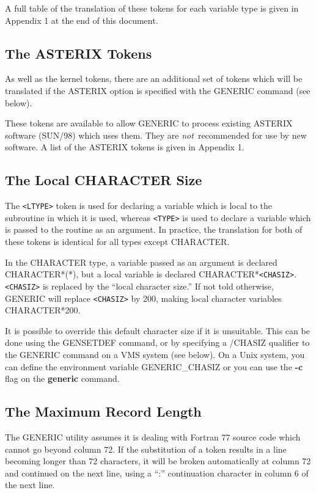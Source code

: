 A full table of the translation of these tokens
for each variable type is given in
Appendix 1 at the end of this document. 

\subsection{The ASTERIX Tokens}

As well as the kernel tokens, there are an additional set of
tokens which will be translated if the ASTERIX option is specified
with the GENERIC command (see below).

These tokens are available to allow GENERIC to process existing
ASTERIX software (SUN/98) which uses them.
They are {\em not}\ recommended for use by new software.
A list of the ASTERIX tokens is given in Appendix 1.

\subsection{The Local CHARACTER Size}

The \verb+<LTYPE>+ token is used for declaring a variable which is local
to the subroutine in which it is used, whereas \verb+<TYPE>+ is used
to declare a variable which is passed to the routine as an argument.
In practice, the translation for both of these tokens is identical
for all types except CHARACTER.

In the CHARACTER type, a variable passed as an argument is declared
CHARACTER*(*), but a local variable is declared CHARACTER*\verb+<CHASIZ>+.
\verb+<CHASIZ>+ is replaced by the ``local character size.''
If not told otherwise, GENERIC will replace \verb+<CHASIZ>+ by 200,
making local character variables CHARACTER*200.

It is possible to override this default character size
if it is unsuitable.
This can be done using the GENSETDEF command, or by specifying
a /CHASIZ qualifier to the GENERIC command on a VMS system (see below).
On a Unix system, you can define the environment variable GENERIC\_CHASIZ or
you can use the {\bf -c} flag on the {\bf generic} command.

\subsection{The Maximum Record Length}
 
The GENERIC utility assumes it is dealing with Fortran 77
source code which cannot go beyond column 72.
If the substitution of a token results in a line becoming longer
than 72 characters, it will be broken automatically at column 72
and continued on the next line, using a ``:'' continuation character
in column 6 of the next line.

